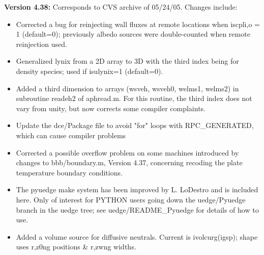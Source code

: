 \documentclass [12pt]{article}
\begin{document}
\noindent\textbf{Version 4.38:} Corresponds to CVS archive of 05/24/05.  
Changes include:
\begin{itemize}
   \item Corrected a bug for reinjecting wall fluxes at remote
	  locations when iscpli,o = 1 (default=0); previously albedo 
	  sources were double-counted when remote reinjection used.
   \item Generalized lynix from a 2D array to 3D with the third
	  index being for density species; used if isulynix=1
	  (default=0).
   \item Added a third dimension to arrays (wsveh, wsveh0, welms1,
	  welms2) in subroutine readeh2 of aphread.m. For this routine,
	  the third index does not vary from unity, but now corrects 
	  some compiler complaints.
   \item Update the dce/Package file to avoid "for" loops with	
	  RPC\_GENERATED, which can cause compiler problems
   \item Corrected a possible overflow problem on some machines
	  introduced by changes to bbb/boundary.m, Version 4.37,
          concerning recoding the plate temperature boundary 
	  conditions.
   \item The pyuedge make system has been improved by L. LoDestro 
	  and is included here.  Only of interest for PYTHON users
	  going down the uedge/Pyuedge branch in the uedge tree; see
	  uedge/README\_Pyuedge for details of how to use.
   \item Added a volume source for diffusive neutrals.  Current is
	  ivolcurg(igsp); shape uses r,z0ng positions \& r,zwng widths.
\end{itemize}
\end{document}
